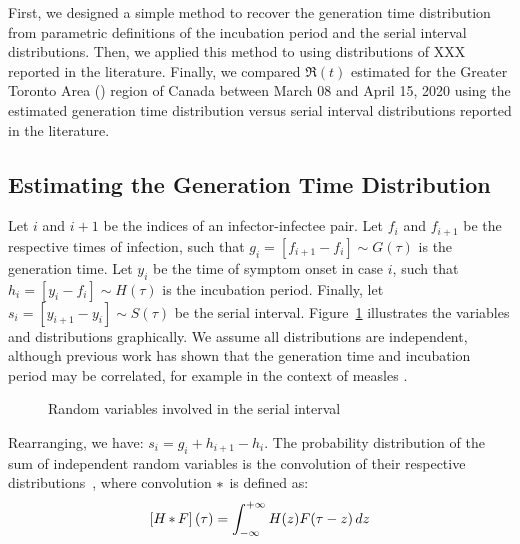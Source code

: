 First, we designed a simple method to
recover the generation time distribution
from parametric definitions of
the incubation period and the serial interval distributions.  %
Then, we applied this method to \covid using
distributions of XXX reported in the literature.   %
Finally, we compared $\Re(t)$ estimated for
the Greater Toronto Area (\gta) region of Canada
between March 08 and April 15, 2020 using
the estimated generation time distribution versus
serial interval distributions reported in the literature.  %
\subsection{Estimating the Generation Time Distribution}
Let $i$ and $i+1$ be the indices of an infector-infectee pair.
Let $f_i$ and $f_{i+1}$ be the respective times of infection,
such that $g_i = [f_{i+1} - f_i] \sim G(\tau)$ is the generation time.
Let $y_i$ be the time of symptom onset in case $i$,
such that $h_i = [y_i - f_i] \sim H(\tau)$ is the incubation period.
Finally, let $s_i = [y_{i+1} - y_i] \sim S(\tau)$ be the serial interval.
Figure~\ref{fig:nodes} illustrates the variables and distributions graphically.
We assume all distributions are independent,
although previous work has shown that
the generation time and incubation period may be correlated,
for example in the context of measles \cite{Klinkenberg2011}.
\par
\begin{figure}
  \centering
  
  \caption{Random variables involved in the serial interval}
  \label{fig:nodes}
\end{figure}
\par
Rearranging, we have:
$s_i = g_i + h_{i+1} - h_i$.
The probability distribution of
the sum of independent random variables
is the convolution of their respective distributions~\cite{Hogg2005},
where convolution $\mathop{\ast}$ is defined as:
\begin{equation}\label{eq:conv}
  \left[H \mathop{\ast} F\right](\tau) = \int_{-\infty}^{+\infty} H(z) F(\tau - z) \,dz
\end{equation}
